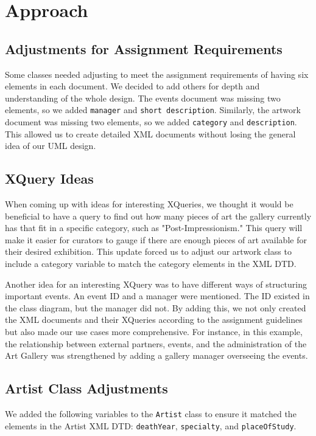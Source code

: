\documentclass{article} %
\begin{document}
\newpage
\section{Approach} 
\subsection{Adjustments for Assignment Requirements}

Some classes needed adjusting to meet the assignment requirements of having six elements 
in each document. We decided to add others for depth and understanding of the whole 
design. The events document was missing two elements, so we added \texttt{manager} and 
\texttt{short description}. Similarly, the artwork document was missing two elements, so 
we added \texttt{category} and \texttt{description}. This allowed us to create detailed 
XML documents without losing the general idea of our UML design.

\subsection{XQuery Ideas}

When coming up with ideas for interesting XQueries, we thought it would be beneficial to 
have a query to find out how many pieces of art the gallery currently has that fit in a 
specific category, such as "Post-Impressionism." This query will make it easier for 
curators to gauge if there are enough pieces of art available for their desired exhibition. 
This update forced us to adjust our artwork class to include a category variable to match 
the category elements in the XML DTD.

Another idea for an interesting XQuery was to have different ways of structuring important 
events. An event ID and a manager were mentioned. The ID existed in the class diagram, 
but the manager did not. By adding this, we not only created the XML documents and their 
XQueries according to the assignment guidelines but also made our use cases more 
comprehensive. For instance, in this example, the relationship between external partners, 
events, and the administration of the Art Gallery was strengthened by adding a gallery 
manager overseeing the events.

\subsection{Artist Class Adjustments}

We added the following variables to the \texttt{Artist} class to ensure it matched the 
elements in the Artist XML DTD: \texttt{deathYear}, \texttt{specialty}, and 
\texttt{placeOfStudy}.
\end{document}
